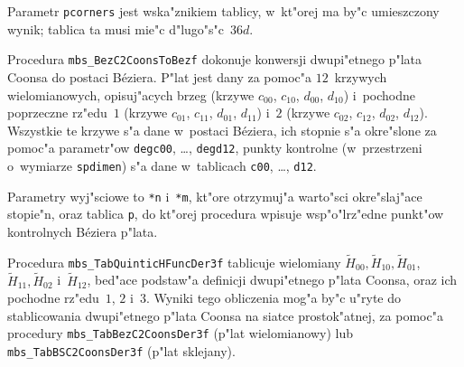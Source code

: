 Parametr \texttt{pcorners} jest wska"znikiem tablicy, w~kt"orej ma by"c
umieszczony wynik; tablica ta musi mie"c d"lugo"s"c~$36d$.


\vspace{\bigskipamount}
Procedura \texttt{mbs\_BezC2CoonsToBezf} dokonuje konwersji dwupi"etnego
p"lata Coonsa do postaci B\'{e}ziera. P"lat jest dany za pomoc"a
$12$~krzywych wielomianowych, opisuj"acych brzeg (krzywe $c_{00}$, $c_{10}$,
$d_{00}$, $d_{10}$) i~pochodne poprzeczne rz"edu~$1$ (krzywe $c_{01}$,
$c_{11}$, $d_{01}$, $d_{11}$) i~$2$ (krzywe $c_{02}$, $c_{12}$, $d_{02}$,
$d_{12}$). Wszystkie te krzywe s"a dane w~postaci B\'{e}ziera, ich stopnie
s"a okre"slone za pomoc"a pa\-ra\-met\-r"ow
\texttt{degc00}, \ldots, \texttt{degd12},
punkty kontrolne (w~przestrzeni o~wymiarze \texttt{spdimen}) s"a dane
w~tablicach \texttt{c00}, \ldots, \texttt{d12}.

Parametry wyj"sciowe to \texttt{*n} i~\texttt{*m}, kt"ore otrzymuj"a
warto"sci okre"slaj"ace stopie"n, oraz tablica \texttt{p}, do kt"orej
procedura wpisuje wsp"o"lrz"edne punkt"ow kontrolnych B\'{e}ziera p"lata.

\vspace{\bigskipamount}
\begin{sloppypar}
Procedura \texttt{mbs\_TabQuinticHFuncDer3f} tablicuje wielomiany   
$\tilde{H}_{00},\tilde{H}_{10},\tilde{H}_{01}$, $\tilde{H}_{11},\tilde{H}_{02}$
i~$\tilde{H}_{12}$, bed"ace podstaw"a definicji dwupi"etnego p"lata Coonsa,
oraz ich pochodne rz"edu~$1$, $2$ i~$3$. Wyniki tego obliczenia mog"a by"c
u"ryte do stablicowania dwupi"etnego p"lata Coonsa na siatce prostok"atnej,
za pomoc"a procedury \texttt{mbs\_TabBezC2CoonsDer3f} (p"lat wielomianowy) lub
\texttt{mbs\_TabBSC2CoonsDer3f} (p"lat sklejany).%
\end{sloppypar}

